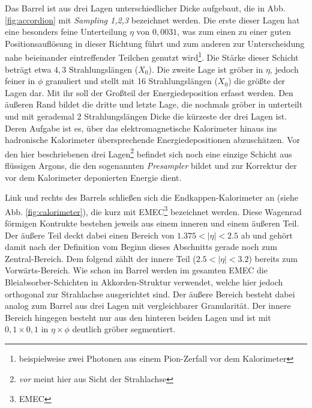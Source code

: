 Das Barrel ist aus drei Lagen unterschiedlicher Dicke aufgebaut, die in Abb.
\ref{fig:accordion} mit \textit{Sampling 1,2,3} bezeichnet werden. Die erste
dieser Lagen hat eine besonders feine Unterteilung $\eta$ von $0,0031$, was zum
einen zu einer guten Positionsauflösung in dieser Richtung führt und zum
anderen zur Unterscheidung nahe beieinander eintreffender Teilchen genutzt
wird\footnote{beispielweise zwei Photonen aus einem Pion-Zerfall vor dem
Kalorimeter}. Die Stärke dieser Schicht beträgt etwa $4,3$ Strahlungslängen
($X_0$). Die zweite Lage ist gröber in $\eta$, jedoch feiner in $\phi$
granuliert und stellt mit 16 Strahlungslängen ($X_0$) die größte der Lagen dar.
Mit ihr soll der Großteil der Energiedeposition erfasst werden. Den äußeren
Rand bildet die dritte und letzte Lage, die nochmals gröber in unterteilt und
mit gerademal 2 Strahlungslängen Dicke die kürzeste der drei Lagen ist. Deren
Aufgabe ist es, über das elektromagnetische Kalorimeter hinaus ins hadronische
Kalorimeter übersprechende Energiedepositionen abzuschätzen. Vor den hier
beschriebenen drei Lagen\footnote{\textit{vor} meint hier aus Sicht der
Strahlachse} befindet sich noch eine einzige Schicht aus flüssigen Argons, die
den sogenannten \textit{Presampler} bildet und zur Korrektur der vor dem
Kalorimeter deponierten Energie dient.

Link und rechts des Barrels schließen sich die Endkappen-Kalorimeter an (siehe
Abb. \ref{fig:calorimeter}), die kurz mit EMEC\footnote{\acf{EMEC}} bezeichnet
werden. Diese Wagenrad förmigen Kontrukte bestehen jeweils aus einem inneren
und einem äußeren Teil. Der äußere Teil deckt dabei einen Bereich von $1.375 <
|\eta| < 2.5$ ab und gehört damit nach der Definition vom Beginn dieses
Abschnitts gerade noch zum Zentral-Bereich. Dem folgend zählt der innere Teil
($2.5<|\eta|<3.2$) bereits zum Vorwärts-Bereich. Wie schon im Barrel werden im
gesamten \ac{EMEC} die Bleiabsorber-Schichten in Akkorden-Struktur verwendet,
welche hier jedoch orthogonal zur Strahlachse ausgerichtet sind. Der äußere
Bereich besteht dabei analog zum Barrel aus drei Lagen mit vergleichbarer
Granularität. Der innere Bereich hingegen besteht nur aus den hinteren beiden
Lagen und ist mit $0,1\times0,1$ in $\eta\times\phi$ deutlich gröber
segmentiert.

